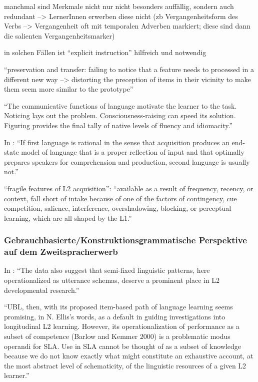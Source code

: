         manchmal sind Merkmale nicht nur nicht besonders auffällig, sondern auch redundant --> LernerInnen erwerben diese nicht (zb Vergangenheitsform des Verbs --> Vergangenheit oft mit temporalen Adverben markiert; diese sind dann die salienten Vergangenheitsmarker)

        in solchen Fällen ist ``explicit instruction'' hilfreich und notwendig

        ``preservation and transfer: failing to notice that a feature needs to processed in a different new way --> distorting the preception of items in their vicinity to make them seem more similar to the prototype''

        ``The communicative functions of language motivate the learner to the task.
        Noticing lays out the problem.
        Consciousness-raising can speed its solution.
        Figuring provides the final tally of native levels of fluency and idiomacity.''

        In \cite{Ellis06}: ``If first language is rational in the sense that acquisition produces an
        end-state model of language that is a proper reflection of input and that
        optimally prepares speakers for comprehension and production, second
        language is usually not.''

        ``fragile features of L2 acquisition'': ``available as a
        result of frequency, recency, or context, fall short of intake because of one of the
        factors of contingency, cue competition, salience, interference, overshadowing,
        blocking, or perceptual learning, which are all shaped by the L1.''

\subsubsection{Gebrauchbasierte/Konstruktionsgrammatische Perspektive auf dem Zweitspracherwerb}

In \cite{Eskildsen08}: ``The data also suggest that semi-fixed linguistic
patterns, here operationalized as utterance schemas, deserve a prominent place
in L2 developmental research.''

``UBL, then, with its proposed item-based path of language learning seems
promising, in N. Ellis’s words, as a default in guiding investigations into
longitudinal L2 learning. However, its operationalization of performance as a
subset of competence (Barlow and Kemmer 2000) is a problematic modus
operandi for SLA. Use in SLA cannot be thought of as a subset of knowledge
because we do not know exactly what might constitute an exhaustive
account, at the most abstract level of schematicity, of the linguistic resources
of a given L2 learner.''

